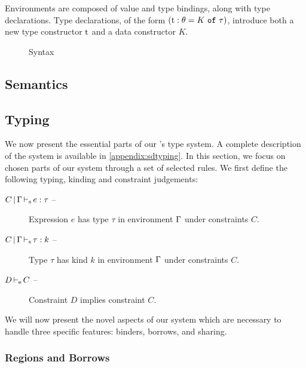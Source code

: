 
Environments are composed of value and type bindings, along with type
declarations. Type declarations, of the form
$(\mathrm{t} : \theta = K\ \mathtt{of}\ \tau)$, introduce both a new type constructor $\mathrm{t}$ and
a data constructor $K$.

\begin{figure*}[t]
  \centering
  
  \caption{Syntax}
  \label{grammar}
\end{figure*}


\clearpage
\subsection{Semantics}
\label{sem}




\clearpage
\subsection{Typing}
\label{sdtyping}

We now present the essential parts of our \lang's type system. A complete
description of the system is available in \cref{appendix:sdtyping}.
In this section, we focus on chosen parts of our system
through a set of selected rules.
%
We first define the following typing, kinding and constraint judgements:
\begin{description}
\item[$C \operatorname{|} \Gamma \operatorname{\vdash_s} e : \tau$ --]
  Expression $e$ has type $\tau$ in environment $\Gamma$ under constraints $C$.
\item[$C \operatorname{|} \Gamma \operatorname{\vdash_s} \tau : k$ --]
  Type $\tau$ has kind $k$ in environment $\Gamma$ under constraints $C$.
\item[$D \operatorname{\vdash_e} C$ --] Constraint $D$ implies constraint $C$.
\end{description}

We will now present the novel aspects of our system which are necessary to handle
three specific features: binders, borrows, and sharing.


\subsubsection{Regions and Borrows}

